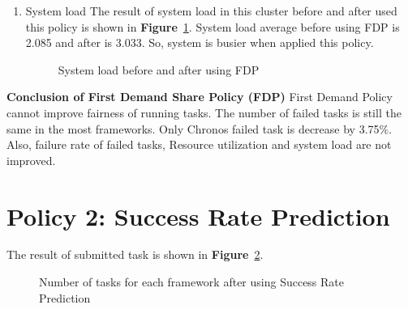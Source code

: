 \documentclass[12pt,oneside,openright,a4paper]{cpe-english-project}
\begin{document}
\begin{enumerate}
  \item System load
  \newline
  The result of system load in this cluster before and after used this policy is shown in \textbf{Figure}~\ref{fig:load1}. System load average before using FDP is 2.085 and after is 3.033. So, system is busier when applied this policy.
\begin{figure}[!h]\centering
    \setlength{\fboxrule}{0mm} %
    \setlength{\fboxsep}{0cm}
    \caption{System load before and after using FDP}\label{fig:load1}
\end{figure}
\end{enumerate}
\textbf{Conclusion of First Demand Share Policy (FDP)}
\newline
\hspace{10mm}First Demand Policy cannot improve fairness of running tasks. The number of failed tasks is still the same in the most frameworks. Only Chronos failed task is decrease by 3.75\%. Also, failure rate of failed tasks, Resource utilization and system load are not improved. 


\section{Policy 2: Success Rate Prediction}  
\hspace{10mm}The result of submitted task is shown in \textbf{Figure}~\ref{fig:task2}.

\begin{figure}[!h]\centering
    \setlength{\fboxrule}{0mm} %
    \setlength{\fboxsep}{0cm}
    \caption{Number of tasks for each framework after using Success Rate Prediction}\label{fig:task2}
\end{figure}
\end{document}
